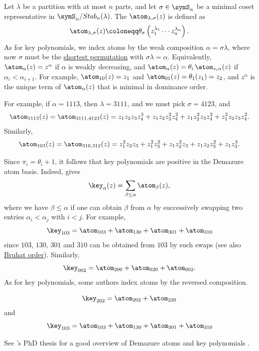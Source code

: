 Let $\lambda$ be a partition with at most $n$ parts, and let $\sigma \in \symS_n$
be a minimal coset representative in $\symS_n / Stab_n(\lambda)$.
The \label{demazureAtom} $\atom_{\lambda,\sigma}(z)$ is
defined as
\begin{equation*}
 \atom_{\lambda,\sigma}(z) \coloneqq \theta_\sigma\left( z_1^{\lambda_1} \dotsm z_n^{\lambda_n} \right).
\end{equation*}
As for key polynomials, we index atoms by the weak composition
$\alpha = \sigma\lambda$, where now $\sigma$ must be the
\hyperref[reducedWord]{shortest permutation} with $\sigma\lambda = \alpha$.
Equivalently, $\atom_\alpha(z) = z^\alpha$ if $\alpha$ is weakly decreasing, and
$\atom_\alpha(z) = \theta_i\, \atom_{s_i\alpha}(z)$ if $\alpha_i < \alpha_{i+1}$.
For example, $\atom_{10}(z) = z_1$ and $\atom_{01}(z) = \theta_1(z_1) = z_2$,
and $z^\alpha$ is the unique term of $\atom_\alpha(z)$ that is minimal in
dominance order.

For example, if $\alpha = 1113$, then $\lambda=3111$,
and we must pick $\sigma = 4123$, and
\[
\atom_{1113}(z) = \atom_{3111,4123}(z) =
z_1 z_2 z_3 z_4^3 +
z_1 z_2 z_3^2 z_4^2 +
z_1 z_2^2 z_3z_4^2 +
z_1^2 z_2 z_3 z_4^2.
\]
Similarly,
\[
 \atom_{103}(z) = \atom_{310,312}(z) = z_1^2 z_2 z_3 + z_1^2 z_3^2 + z_1 z_2^2 z_3
  + z_1 z_2 z_3^2 + z_1 z_3^3.
\]

Since $\pi_i = \theta_i+1$, it follows that key polynomials are
positive in the Demazure atom basis.
Indeed, \cite[Thm.~2.8]{Pun2016Thesis} gives
\[
	\key_{\alpha}(z) = \sum_{\beta \leq \alpha} \atom_{\beta}(z),
\]
where we have $\beta \leq \alpha$ if one can obtain
$\beta$ from $\alpha$ by successively swapping two entries
$\alpha_i < \alpha_j$ with $i < j$.
For example,
\[
 \key_{103} = \atom_{103} + \atom_{130}+\atom_{301}+\atom_{310}
\]
since $103$, $130$, $301$ and $310$ can be obtained from $103$
by such swaps (see also \hyperref[bruhatOrder]{Bruhat order}).
Similarly,
\[
\key_{002} = \atom_{200} + \atom_{020} + \atom_{002}.
\]
As for key polynomials, some authors index atoms by the reversed composition.

\begin{example*}
\[
 \key_{202} = \atom_{202}+\atom_{220}
\]
and
\[
 \key_{103} = \atom_{103} + \atom_{130}+\atom_{301}+\atom_{310}
\]
\end{example*}

See 's PhD thesis for a good overview of Demazure atoms and
key polynomials \cite{Pun2016Thesis}.

